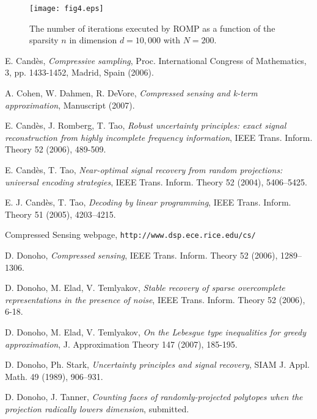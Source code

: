 \documentclass[12pt]{amsart}
\theoremstyle{plain}
\theoremstyle{definition}
\theoremstyle{remark}
\numberwithin{equation}{section}
\begin{document}
 
 

\begin{figure}[ht] 
  \texttt{[image: fig4.eps]}
  \caption{The number of iterations executed by ROMP as a function of the sparsity $n$ in dimension $d=10,000$ with $N=200$.}\label{fig:itsROMP}
\end{figure}

 
  

\clearpage

{\small
\begin{thebibliography}{S 99}

 E. Cand\`es, 
  {\em Compressive sampling}, 
  Proc. International Congress of Mathematics, 3, pp. 1433-1452, 
  Madrid, Spain (2006).

 A. Cohen, W. Dahmen, R. DeVore,
  {\em Compressed sensing and k-term approximation},
  Manuscript (2007).

 E. Cand\`es, J. Romberg, T. Tao, 
  {\em Robust uncertainty principles: exact signal reconstruction 
  from highly incomplete frequency information}, 
  IEEE Trans. Inform. Theory 52 (2006), 489-509.

 E. Cand\`es, T. Tao,
  {\em Near-optimal signal recovery from random projections:
  universal encoding strategies},
  IEEE Trans. Inform. Theory 52 (2004), 5406--5425.

 E. J. Cand\`es, T. Tao,
  {\em Decoding by linear programming}, 
  IEEE Trans. Inform. Theory 51 (2005), 4203--4215.
  
 Compressed Sensing webpage, 
  \verb=http://www.dsp.ece.rice.edu/cs/=

  
 D. Donoho,
 {\em Compressed sensing},
 IEEE Trans. Inform. Theory 52 (2006), 1289--1306. 

 D. Donoho, M. Elad, V. Temlyakov, 
	{\em Stable recovery of sparse overcomplete representations in the presence of noise},
	IEEE Trans. Inform. Theory 52 (2006), 6-18.
	
 D. Donoho, M. Elad, V. Temlyakov, 
	{\em On the Lebesgue type inequalities for greedy approximation},
	J. Approximation Theory 147 (2007), 185-195.
	
 D. Donoho, Ph. Stark, 
  {\em Uncertainty principles and signal recovery},  
  SIAM J. Appl. Math.  49  (1989), 906--931.
  
   D. Donoho, J. Tanner,
  {\em Counting faces of randomly-projected polytopes when the projection radically 
  lowers dimension}, submitted.
  

\end{thebibliography}}
\end{document}
